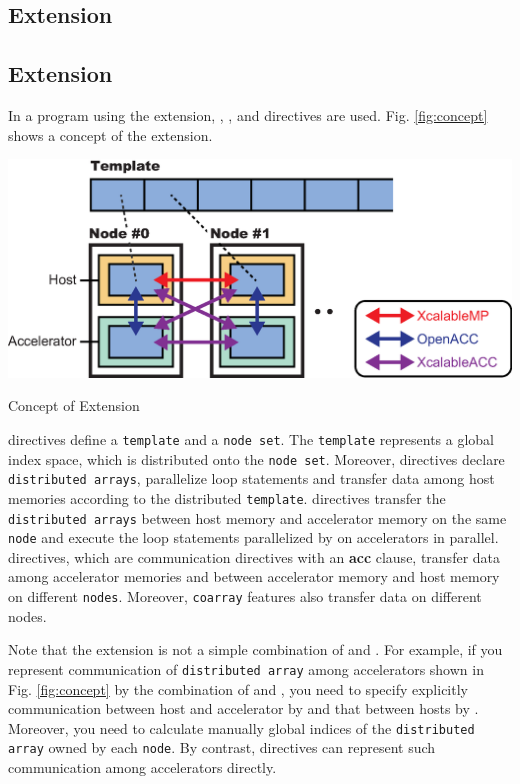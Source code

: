 \subsection{{\OACC} Extension}
\subsection{{\XMP} Extension}
In a program using the {\XMP} extension,
{\XMP}, {\OACC}, and {\XACC} directives are used.
Fig. \ref{fig:concept} shows a concept of the {\XMP} extension.

\begin{myfigure}
\includegraphics[scale=0.5,clip]{figs/concept.eps}
  \caption{Concept of {\XMP} Extension}\label{fig:concept}
\end{myfigure}

{\XMP} directives define a {\tt template} and a {\tt node set}.
The {\tt template} represents a global index space, which is distributed onto the {\tt node set}.
Moreover, {\XMP} directives declare {\tt distributed arrays},
parallelize loop statements and transfer data among host memories according to the distributed {\tt template}.
{\OACC} directives transfer the {\tt distributed arrays} between host memory and accelerator memory on the same {\tt node}
and execute the loop statements parallelized by {\XMP} on accelerators in parallel.
{\XACC} directives, which are {\XMP} communication directives with an {\bf acc} clause, 
transfer data among accelerator memories and between accelerator memory and host memory on different {\tt nodes}.
Moreover, 
{\tt coarray} features also transfer data on different nodes.

Note that 
the {\XMP} extension is not a simple combination of {\XMP} and {\OACC}.
For example, 
if you represent communication of {\tt distributed array} among accelerators shown in Fig. \ref{fig:concept} by the combination of {\XMP} and {\OACC},
you need to specify explicitly communication between host and accelerator by {\OACC} and that between hosts by {\XMP}.
Moreover,
you need to calculate manually global indices of the {\tt distributed array} owned by each {\tt node}.
By contrast,
{\XACC} directives can represent such communication among accelerators directly.

